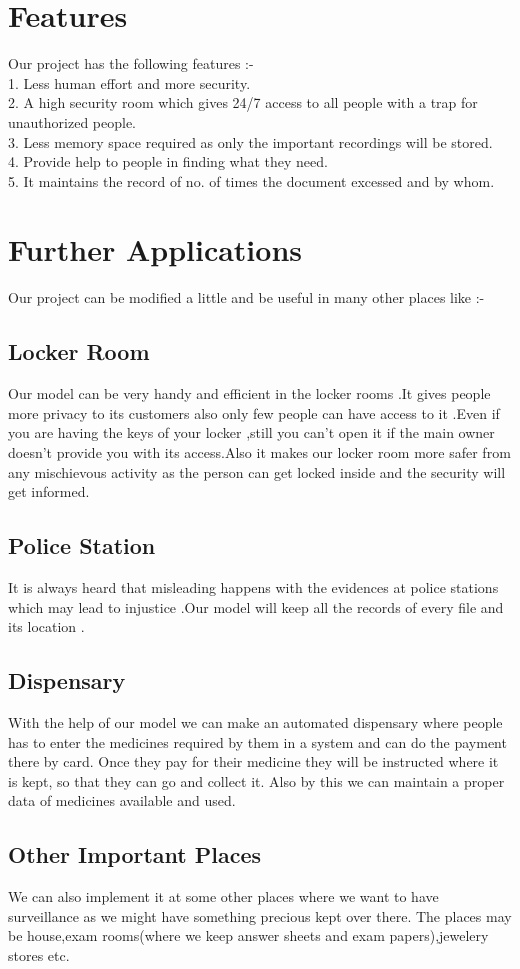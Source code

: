 \documentclass[12pt]{article}
\begin{document}
\newpage
\section{Features}
Our project has the following features :-\\[0.5cm]
1. Less human effort and more security.\\[0.2cm]
2. A high security room which gives 24/7 access to all people with a trap for unauthorized people.\\[0.2cm]
3. Less memory space required as only the important recordings will be stored.\\[0.2cm]
4. Provide help to people in finding what they need.\\[0.2cm]
5. It maintains the record of no. of times the document excessed and by whom.\\



\section{Further Applications}
Our project can be modified a little and be useful in many other places like :-
 
\subsection{Locker Room}
Our model can be very handy and efficient in the locker rooms .It gives people more privacy to its customers also only few people can have access to it .Even if you are having the keys of your locker ,still you can't open it if the main owner doesn't provide you with its access.Also it makes our locker room more safer from any mischievous activity as the person can get locked inside and the security will get informed. 
 
\subsection{Police Station}
It is always heard that misleading happens with the evidences at police stations which may lead to injustice .Our model will keep all the records of every file and its location . 

\subsection{Dispensary}
With the help of our model we can make an automated dispensary where people has to enter the medicines required by them in a system and can do the payment there by card. Once they pay for their medicine they will be instructed where it is kept, so that they can go and collect it. Also by this we can maintain a proper data of medicines available and used.

\subsection{Other Important Places}
We can also implement it at some other places where we want to have surveillance as we might have something precious kept over there. The places may be house,exam rooms(where we keep answer sheets and exam papers),jewelery stores etc. 
\end{document}
